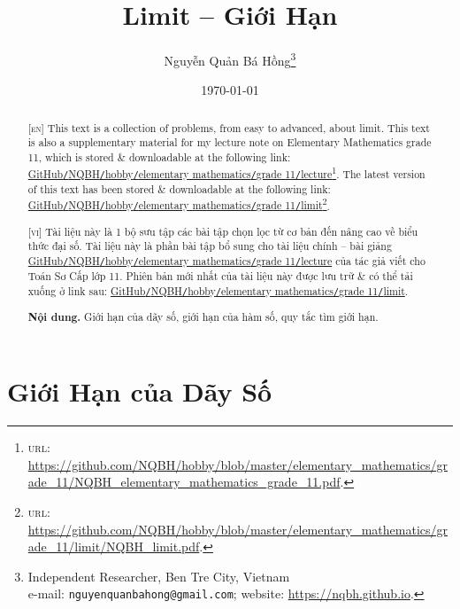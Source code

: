 \documentclass{article}
\title{Limit -- Giới Hạn}
\author{Nguyễn Quản Bá Hồng\footnote{Independent Researcher, Ben Tre City, Vietnam\\e-mail: \texttt{nguyenquanbahong@gmail.com}; website: \url{https://nqbh.github.io}.}}
\date{\today}
\numberwithin{equation}{section}
\begin{document}
\maketitle
\begin{abstract}
	\textsc{[en]} This text is a collection of problems, from easy to advanced, about limit. This text is also a supplementary material for my lecture note on Elementary Mathematics grade 11, which is stored \& downloadable at the following link: \href{https://github.com/NQBH/hobby/blob/master/elementary_mathematics/grade_11/NQBH_elementary_mathematics_grade_11.pdf}{GitHub\texttt{/}NQBH\texttt{/}hobby\texttt{/}elementary mathematics\texttt{/}grade 11\texttt{/}lecture}\footnote{\textsc{url}: \url{https://github.com/NQBH/hobby/blob/master/elementary_mathematics/grade_11/NQBH_elementary_mathematics_grade_11.pdf}.}. The latest version of this text has been stored \& downloadable at the following link: \href{https://github.com/NQBH/hobby/blob/master/elementary_mathematics/grade_11/limit/NQBH_limit.pdf}{GitHub\texttt{/}NQBH\texttt{/}hobby\texttt{/}elementary mathematics\texttt{/}grade 11\texttt{/}limit}\footnote{\textsc{url}: \url{https://github.com/NQBH/hobby/blob/master/elementary_mathematics/grade_11/limit/NQBH_limit.pdf}.}.
	\vspace{2mm}
	
	\textsc{[vi]} Tài liệu này là 1 bộ sưu tập các bài tập chọn lọc từ cơ bản đến nâng cao về biểu thức đại số. Tài liệu này là phần bài tập bổ sung cho tài liệu chính -- bài giảng \href{https://github.com/NQBH/hobby/blob/master/elementary_mathematics/grade_11/NQBH_elementary_mathematics_grade_11.pdf}{GitHub\texttt{/}NQBH\texttt{/}hobby\texttt{/}elementary mathematics\texttt{/}grade 11\texttt{/}lecture} của tác giả viết cho Toán Sơ Cấp lớp 11. Phiên bản mới nhất của tài liệu này được lưu trữ \& có thể tải xuống ở link sau: \href{https://github.com/NQBH/hobby/blob/master/elementary_mathematics/grade_11/limit/NQBH_limit.pdf}{GitHub\texttt{/}NQBH\texttt{/}hobby\texttt{/}elementary mathematics\texttt{/}grade 11\texttt{/}limit}.
	
	\textsf{\textbf{Nội dung.} Giới hạn của dãy số, giới hạn của hàm số, quy tắc tìm giới hạn.}
\end{abstract}
\tableofcontents
\newpage


\section{Giới Hạn của Dãy Số}
\end{document}
